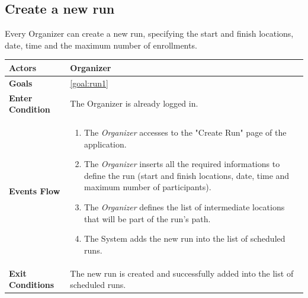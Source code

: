   \newpage
  \subsection{Create a new run}
Every Organizer can create a new run, specifying the start and finish locations, date, time and the maximum number of enrollments.

\begin{table}[H]
	\centering
    
    \begin{tabular}{|p{3.5cm}|p{10.3cm}|}
    
    \hline
    \textbf{\large{Actors}} & Organizer \\			
    \hline		 					
    \textbf{\large{Goals}} 				& \ref{goal:run1}\\
    
    \hline
    \textbf{\large{Enter Condition}}	& The Organizer is already logged in.		\\
    
    \hline
    \textbf{\large{Events Flow}}		& \begin{enumerate}[leftmargin=0.5cm]
                                          	\item The \emph{Organizer}  accesses to the "Create Run" page of the application.
                                            \item The \emph{Organizer} inserts all the required informations to define the run (start and finish locations, date, time and maximum number of participants).
                                             \item The \emph{Organizer} defines the list of intermediate locations that will be part of the run's path.
                                            \item The System adds the new run into the list of scheduled runs.
                                           
                                          \end{enumerate}
    										\\
    \hline
    \textbf{\large{Exit Conditions}}    & The new run is created and successfully added into the list of scheduled runs.  \\
    

\end{tabular}
\end{table}

